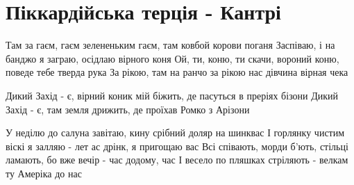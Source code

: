 \section{Піккардійська терція - Кантрі}
\begin{guitar}
Там за гаєм, гаєм зелененьким гаєм, там ковбой корови поганя
Заспіваю, і на банджо я заграю, осідлаю вірного коня
Ой, ти, коню, ти скачи, вороний коню, поведе тебе тверда рука
За рікою, там на ранчо за рікою нас дівчина вірная чека

Дикий Захід - є, вірний коник мій біжить, де пасуться в преріях бізони
Дикий Захід - є, там земля дрижить, де проїхав Ромко з Арізони

У неділю до салуна завітаю, кину срібний доляр на шинквас
І горлянку чистим віскі я залляю - лет ас дрінк, я пригощаю вас
Всі співають, морди б'ють, стільці ламають, бо вже вечір - час додому, час
І весело по пляшках стріляють - велкам ту Амеріка до нас
\end{guitar}